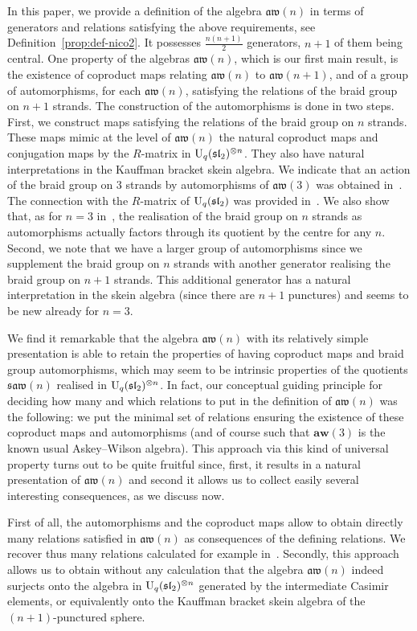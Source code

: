\documentclass[pdftex]{sigma}
\numberwithin{equation}{section}
\theoremstyle{definition}
\newcommand{\aw}{\mathfrak{aw}(n)}
\newcommand{\saw}{\mathfrak{saw}(n)}
\begin{document}
In this paper, we provide a definition of the algebra $\aw$ in terms of generators and relations satisfying the above requirements, see Definition~\ref{prop:def-nico2}.
It possesses $\frac{n(n+1)}2$ generators, $n+1$ of them being central.
One property of the algebras $\aw$, which is our first main result, is the existence of coproduct maps relating $\aw$ to $\mathfrak{aw}(n+1)$,
and of a group of automorphisms, for each $\aw$, satisfying the relations of the braid group on $n+1$ strands.
The construction of the automorphisms is done in two steps. First, we construct maps satisfying the relations of the braid group on $n$ strands.
These maps mimic at the level of $\aw$ the natural coproduct maps and conjugation maps by the $R$-matrix in ${\rm U}_q(\mathfrak{sl}_2)^{\otimes n}$. They also have natural interpretations in the Kauffman bracket skein algebra. We indicate that an action of the braid group on $3$ strands by automorphisms of $\mathfrak{aw}(3)$ was obtained in~\cite{Ter}. The connection with the $R$-matrix of ${\rm U}_q(\mathfrak{sl}_2)$ was provided in~\cite{CGVZ}. We also show that, as for $n=3$ in~\cite{Ter}, the realisation of the braid group on $n$ strands as automorphisms actually factors through its quotient by the centre for any $n$. Second, we note that we have a larger group of automorphisms since we supplement the braid group on $n$ strands with another generator realising the braid group on $n+1$ strands. This additional generator has a natural interpretation in the skein algebra (since there are $n+1$ punctures) and seems to be new already for $n=3$.

We find it remarkable that the algebra $\aw$ with its relatively simple presentation is able to retain the properties of having coproduct maps and braid group automorphisms, which may seem to be intrinsic properties of the quotients $\saw$ realised in ${\rm U}_q(\mathfrak{sl}_2)^{\otimes n}$. In fact, our conceptual guiding principle for deciding how many and which relations to put in the definition of $\aw$ was the following: we put the minimal set of relations ensuring the existence of these coproduct maps and automorphisms (and of course such that $\textbf{aw}(3)$ is the known usual Askey--Wilson algebra). This approach via this kind of universal property turns out to be quite fruitful since, first, it results in a natural presentation of $\aw$ and second it allows us to collect easily several interesting consequences, as we discuss now.

First of all, the automorphisms and the coproduct maps allow to obtain directly many relations satisfied in $\aw$ as consequences of the defining relations.
We recover thus many relations calculated for example in~\cite{CL, DeC, PostWalt}. Secondly, this approach allows us to obtain without any calculation that the algebra $\aw$ indeed surjects onto the algebra in ${\rm U}_q(\mathfrak{sl}_2)^{\otimes n}$
generated by the intermediate Casimir elements, or equivalently onto the Kauffman bracket skein algebra of the $(n+1)$-punctured sphere.
\end{document}
